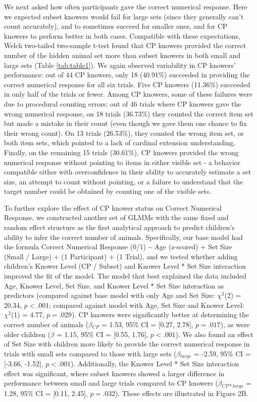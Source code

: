 \documentclass[
  man,floatsintext]{apa7}
\begin{document}
We next asked how often participants gave the correct numerical response. Here we expected subset knowers would fail for large sets (since they generally can't count accurately), and to sometimes succeed for smaller ones, and for CP knowers to perform better in both cases. Compatible with these expectations, Welch two-tailed two-sample t-test found that CP knowers provided the correct number of the hidden animal set more than subset knowers in both small and large sets (Table \ref{tab:table1}). We again observed variability in CP knowers' performance: out of 44 CP knowers, only 18 (40.91\%) succeeded in providing the correct numerical response for all six trials. Five CP knowers (11.36\%) succeeded in only half of the trials or fewer.
Among CP knowers, some of these failures were due to procedural counting errors: out of 46 trials where CP knowers gave the wrong numerical response, on 18 trials (36.73\%) they counted the correct item set but made a mistake in their count (even though we gave them one chance to fix their wrong count).
On 13 trials (26.53\%), they counted the wrong item set, or both item sets, which pointed to a lack of cardinal extension understanding. Finally, on the remaining 15 trials (30.61\%), CP knowers provided the wrong numerical response without pointing to items in either visible set - a behavior compatible either with overconfidence in their ability to accurately estimate a set size, an attempt to count without pointing, or a failure to understand that the target number could be obtained by counting one of the visible sets.

To further explore the effect of CP knower status on Correct Numerical Response, we constructed another set of GLMMs with the same fixed and random effect structure as the first analytical approach to predict children's ability to infer the correct number of animals. Specifically, our base model had the formula Correct Numerical Response (0/1) \textasciitilde{} Age (z-scored) + Set Size (Small / Large) + (1 \textbar{} Participant) + (1 \textbar{} Trial), and we tested whether adding children's Knower Level (CP / Subset) and Knower Level * Set Size interaction improved the fit of the model. The model that best explained the data included Age, Knower Level, Set Size, and Knower Level * Set Size interaction as predictors (compared against base model with only Age and Set Size: \(\chi^2\)(2) = 20.34, \(p < .001\); compared against model with Age, Set Size and Knower Level: \(\chi^2\)(1) = 4.77, \(p = .029\)). CP knowers were significantly better at determining the correct number of animals (\(\beta\)\(_{CP}\) = 1.53, 95\% CI = {[}0.27, 2.78{]}, \(p = .017\)), as were older children (\(\beta\) = 1.15, 95\% CI = {[}0.55, 1.76{]}, \(p < .001\)). We also found an effect of Set Size with children more likely to provide the correct numerical response in trials with small sets compared to those with large sets (\(\beta\)\(_{large}\) = -2.59, 95\% CI = {[}-3.66, -1.52{]}, \(p < .001\)). Additionally, the Knower Level * Set Size interaction effect was significant, where subset knowers showed a larger difference in performance between small and large trials compared to CP knowers (\(\beta\)\(_{CP*large}\) = 1.28, 95\% CI = {[}0.11, 2.45{]}, \(p = .032\)). These effects are illustrated in Figure 2B.
\end{document}
